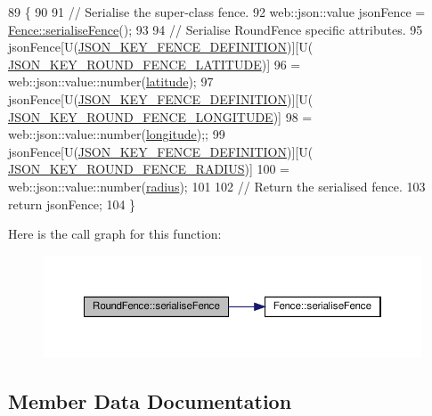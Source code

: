 \begin{DoxyCode}
89 \{
90 
91     \textcolor{comment}{// Serialise the super-class fence.}
92     web::json::value jsonFence = \hyperlink{class_fence_a5c8529e80a4444cc9ca0fb660cbf07c8}{Fence::serialiseFence}();
93 
94     \textcolor{comment}{// Serialise RoundFence specific attributes.}
95     jsonFence[U(\hyperlink{_fence_8h_a698e69a18d481c1033ae9f7d6fb2e5b6}{JSON\_KEY\_FENCE\_DEFINITION})][U(
      \hyperlink{_round_fence_8h_a129fc0ce4ddf2284b58daf8670b24848}{JSON\_KEY\_ROUND\_FENCE\_LATITUDE})]
96             = web::json::value::number(\hyperlink{class_round_fence_ad48cb4c95dab320652679bae203b7caf}{latitude});
97     jsonFence[U(\hyperlink{_fence_8h_a698e69a18d481c1033ae9f7d6fb2e5b6}{JSON\_KEY\_FENCE\_DEFINITION})][U(
      \hyperlink{_round_fence_8h_acfc741eefa291fc8d2db8b0cfb4ddaa4}{JSON\_KEY\_ROUND\_FENCE\_LONGITUDE})]
98             = web::json::value::number(\hyperlink{class_round_fence_a122cccc61f294c1fcdf7ebe944944fca}{longitude});;
99     jsonFence[U(\hyperlink{_fence_8h_a698e69a18d481c1033ae9f7d6fb2e5b6}{JSON\_KEY\_FENCE\_DEFINITION})][U(
      \hyperlink{_round_fence_8h_a40c147f826ff3297cb7eea73a4d00d43}{JSON\_KEY\_ROUND\_FENCE\_RADIUS})]
100             = web::json::value::number(\hyperlink{class_round_fence_a8e9d1a2f22df0bb718522f3ab6cd3b83}{radius});
101 
102     \textcolor{comment}{// Return the serialised fence.}
103     \textcolor{keywordflow}{return} jsonFence;
104 \}
\end{DoxyCode}
Here is the call graph for this function\+:
\nopagebreak
\begin{figure}[H]
\begin{center}
\leavevmode
\includegraphics[width=350pt]{da/d8b/class_round_fence_ae9dd3e4291f7509ce557a6c28cdd682d_cgraph}
\end{center}
\end{figure}


\subsection{Member Data Documentation}
\mbox{\label{class_round_fence_ad48cb4c95dab320652679bae203b7caf}} 
